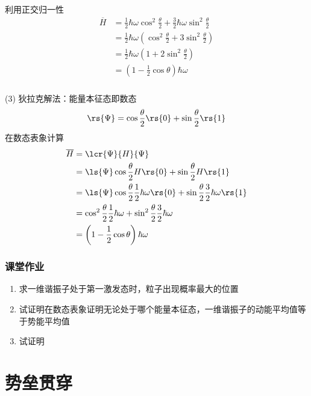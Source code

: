   \begin{frame}
    \frametitle{}
    利用正交归一性
    \[
        \begin{aligned}
         \overline{H} &= \frac{1}{2}\hbar \omega \cos^2 \frac{\theta}{2} + \frac{3}{2}\hbar \omega \sin^2 \frac{\theta}{2} \\
         &=\frac{1}{2}\hbar \omega \left( \cos^2 \frac{\theta}{2} + 3 \sin^2 \frac{\theta}{2} \right) \\ 
         &= \frac{1}{2}\hbar \omega \left( 1 + 2 \sin^2 \frac{\theta}{2} \right)  \\
         &= \left(1-\frac{1}{2} \cos \theta\right) \hbar \omega
        \end{aligned}     
        \]
  \end{frame} 
  \begin{frame}[label=current]
    \frametitle{}
  (3) 狄拉克解法：能量本征态即数态
  $$
  \rs{\Psi}=\cos \frac{\theta}{2} \rs{0}+\sin \frac{\theta}{2} \rs{1}
  $$
  在数态表象计算
\[ \begin{aligned}
  \overline{H} &= \lcr{\Psi}{H}{\Psi} \\ 
  &= \ls{\Psi} \cos \frac{\theta}{2} H \rs{0}+\sin \frac{\theta}{2} H \rs{1} \\
  &= \ls{\Psi} \cos \frac{\theta}{2} \frac{1}{2}\hbar \omega \rs{0}+\sin \frac{\theta}{2} \frac{3}{2}\hbar \omega \rs{1} \\
  &= \cos ^2\frac{\theta}{2} \frac{1}{2}\hbar \omega + \sin ^2\frac{\theta}{2} \frac{3}{2}\hbar \omega \\
  &= \left(1-\frac{1}{2} \cos \theta\right) \hbar \omega
\end{aligned}\]
  \end{frame} 

\begin{frame}[label=current]
  \frametitle{课堂作业}
\begin{enumerate}
  \item 求一维谐振子处于第一激发态时，粒子出现概率最大的位置
  \item 试证明在数态表象证明无论处于哪个能量本征态，一维谐振子的动能平均值等于势能平均值
  \item 试证明 \[ \]
\end{enumerate}
\end{frame} 



\section{势垒贯穿}

